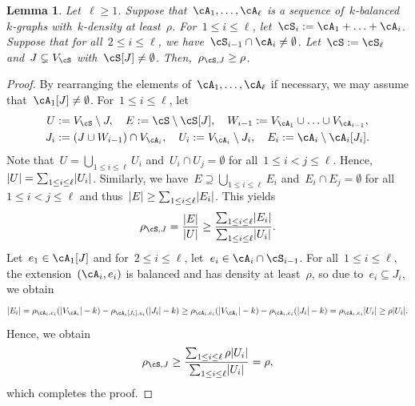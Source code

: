 \documentclass[11pt]{amsart}
\DeclarePairedDelimiter{\abs}{\lvert}{\rvert}
\newtheorem{lemma}[algocf]{Lemma}
\theoremstyle{definition}
\numberwithin{equation}{section}
\begin{document}
	
	\begin{lemma}\label{lemma: balanced gluing rest density}
		Let~$\ell\geq 1$.
		Suppose that~$\cA_1,\ldots,\cA_\ell$ is a sequence of~$k$-balanced~$k$-graphs with~$k$-density at least~$\rho$.
		For~$1\leq i\leq\ell$, let~$\cS_i:=\cA_1+\ldots+\cA_i$.
		Suppose that for all~$2\leq i\leq\ell$, we have~$\cS_{i-1}\cap \cA_i\neq\emptyset$.
		Let~$\cS:=\cS_\ell$ and~$J\subsetneq V_{\cS}$ with~$\cS[J]\neq\emptyset$.
		Then,~$\rho_{\cS,J}\geq \rho$.
	\end{lemma}
	\begin{proof}
		By rearranging the elements of~$\cA_1,\ldots,\cA_\ell$ if necessary, we may assume that~$\cA_1[J]\neq\emptyset$.
		For~$1\leq i\leq\ell$, let
		\begin{equation*}
			\begin{gathered}
				U:=V_\cS\setminus J,\quad
				E:=\cS\setminus \cS[J],\quad
				W_{i-1}:=V_{\cA_1}\cup \ldots\cup V_{\cA_{i-1}},\\
				J_i:=(J\cup W_{i-1})\cap V_{\cA_i},\quad
				U_i:=V_{\cA_i}\setminus J_i,\quad
				E_i:=\cA_i\setminus \cA_i[J_i].
			\end{gathered}
		\end{equation*}
		Note that~$U=\bigcup_{1\leq i\leq\ell} U_i$ and~$U_i\cap U_j=\emptyset$ for all~$1\leq i<j\leq\ell$.
		Hence,~$\abs{U}=\sum_{1\leq i\leq\ell}\abs{U_i}$.
		Similarly, we have~$E\supseteq \bigcup_{1\leq i\leq \ell} E_i$ and~$E_i\cap E_j=\emptyset$ for all~$1\leq i<j\leq\ell$ and thus~$\abs{E}\geq \sum_{1\leq i\leq\ell}\abs{E_i}$.
		This yields
		\begin{equation*}
			\rho_{\cS,J}
			=\frac{\abs{E}}{\abs{U}}
			\geq \frac{ \sum_{1\leq i\leq\ell}\abs{E_i} }{ \sum_{1\leq i\leq\ell } \abs{U_i} }.
		\end{equation*}
		Let~$e_1\in\cA_1[J]$ and for~$2\leq i\leq\ell$, let~$e_i\in\cA_i\cap \cS_{i-1}$.
		For all~$1\leq i\leq\ell$, the extension~$(\cA_i,e_i)$ is balanced and has density at least~$\rho$, so due to~$e_i\subseteq J_i$, we obtain
		\begin{equation*}
			\abs{E_i}
			=\rho_{\cA_i,e_i}(\abs{V_{\cA_i}}-k)-\rho_{\cA_i[J_i],e_i}(\abs{J_i}-k)
			\geq \rho_{\cA_i,e_i}(\abs{V_{\cA_i}}-k)-\rho_{\cA_i,e_i}(\abs{J_i}-k)
			=\rho_{\cA_i,e_i}\abs{U_i}
			\geq \rho\abs{U_i}.
		\end{equation*}
		Hence, we obtain
		\begin{equation*}
			\rho_{\cS,J}
			\geq \frac{ \sum_{1\leq i\leq\ell}\rho\abs{U_i} }{ \sum_{1\leq i\leq\ell } \abs{U_i} }
			=\rho,
		\end{equation*}
		which completes the proof.
	\end{proof}
	
\end{document}
